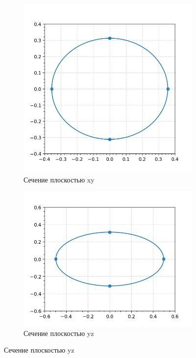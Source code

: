 \documentclass[a4paper,12pt]{article}
\begin{document}
\begin{itemize}
\begin{figure}[h!!]
\begin{subfigure}{0.33\textwidth}
                \includegraphics[width=\linewidth, height=\linewidth]{par_xy.png}
                \caption*{Сечение плоскостью xy}
                \label{fig:subim2}
            \end{subfigure}
            \begin{subfigure}{0.33\textwidth}
                \includegraphics[width=\linewidth, height=\linewidth]{par_yz.png}
                \caption*{Сечение плоскостью yz}
                \label{fig:subim3}
            \end{subfigure}

        \end{figure}


    \end{itemize}
\end{document}
